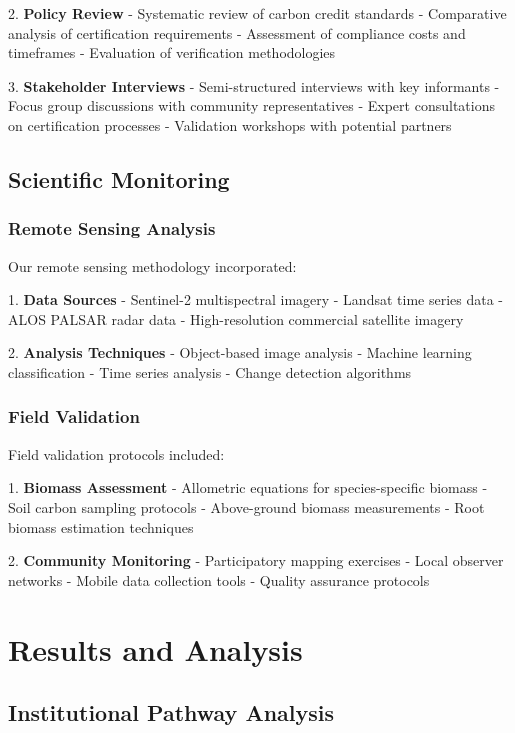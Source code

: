 \documentclass{article}
\theoremstyle{plain}
\theoremstyle{definition}
\theoremstyle{remark}
\begin{document}
\begin{multicols}{2}
2. \textbf{Policy Review}
   - Systematic review of carbon credit standards
   - Comparative analysis of certification requirements
   - Assessment of compliance costs and timeframes
   - Evaluation of verification methodologies

3. \textbf{Stakeholder Interviews}
   - Semi-structured interviews with key informants
   - Focus group discussions with community representatives
   - Expert consultations on certification processes
   - Validation workshops with potential partners

\subsection{Scientific Monitoring}

\subsubsection{Remote Sensing Analysis}
Our remote sensing methodology incorporated:

1. \textbf{Data Sources}
   - Sentinel-2 multispectral imagery
   - Landsat time series data
   - ALOS PALSAR radar data
   - High-resolution commercial satellite imagery

2. \textbf{Analysis Techniques}
   - Object-based image analysis
   - Machine learning classification
   - Time series analysis
   - Change detection algorithms

\subsubsection{Field Validation}
Field validation protocols included:

1. \textbf{Biomass Assessment}
   - Allometric equations for species-specific biomass
   - Soil carbon sampling protocols
   - Above-ground biomass measurements
   - Root biomass estimation techniques

2. \textbf{Community Monitoring}
   - Participatory mapping exercises
   - Local observer networks
   - Mobile data collection tools
   - Quality assurance protocols

\section{Results and Analysis}

\subsection{Institutional Pathway Analysis}


\end{multicols}
\end{document}
